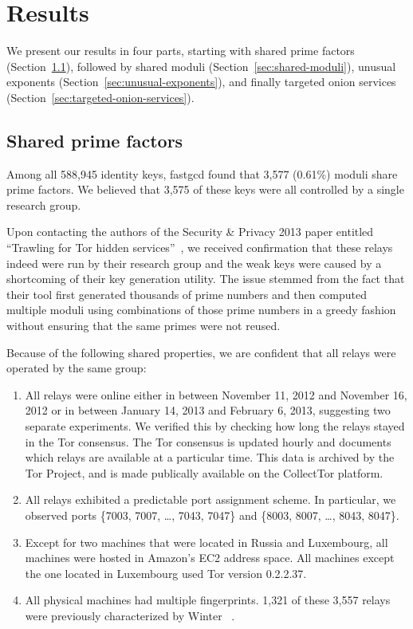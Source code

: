 \section{Results}
\label{sec:results}
We present our results in four parts, starting with shared prime factors
(Section~\ref{sec:shared-primes}), followed by shared moduli
(Section~\ref{sec:shared-moduli}), unusual exponents 
(Section~\ref{sec:unusual-exponents}), and finally targeted onion services
(Section~\ref{sec:targeted-onion-services}).

\subsection{Shared prime factors}
\label{sec:shared-primes}
Among all 588,945 identity keys, fastgcd found that 3,577 (0.61\%) 
moduli share prime factors.  We believed that 3,575 of these keys 
were all controlled by a single research group.  

Upon contacting the authors of the Security \& Privacy 2013 paper entitled
``Trawling for Tor hidden services''~\cite{Biryukov2013a}, we received
confirmation that these relays indeed were run by their research group and the
weak keys were caused by a shortcoming of their key generation utility. The
issue stemmed from the fact that their tool first generated thousands of prime
numbers and then computed multiple moduli using combinations of those prime
numbers in a greedy fashion without ensuring that the same primes were not
reused.

Because of the following shared properties, we are confident that all relays
were operated by the same group:

\begin{enumerate}
	\item All relays were online either in between November 11, 2012 and
		November 16, 2012 or in between January 14, 2013 and February 6, 2013,
		suggesting two separate experiments. We verified this by checking how
		long the relays stayed in the Tor consensus. The Tor consensus is
		updated hourly and documents which relays are available at a particular
		time. This data is archived by the Tor Project, and is made publically
		available on the CollectTor platform.

	\item All relays exhibited a predictable port assignment scheme.  In
		particular, we observed ports \{7003, 7007, \dots, 7043, 7047\} and
		\{8003, 8007, \dots, 8043, 8047\}.

	\item Except for two machines that were located in Russia and Luxembourg,
		all machines were hosted in Amazon's EC2 address space.  All machines
		except the one located in Luxembourg used Tor version 0.2.2.37.

	\item All physical machines had multiple fingerprints.  1,321 of these 3,557
		relays were previously characterized by Winter
		\ea~\cite[\S~5.1]{Winter2016a}.
\end{enumerate}

